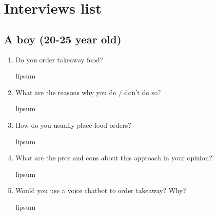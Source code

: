 \section{Interviews list}


\subsection*{A boy (20-25 year old)}

\begin{enumerate}

\item Do you order takeaway food?

lipsum

\item What are the reasons why you do / don't do so?

lipsum

\item How do you usually place food orders?

lipsum

\item What are the pros and cons about this approach in your opinion?

lipsum

\item Would you use a voice chatbot to order takeaway? Why?

lipsum

\end{enumerate}

